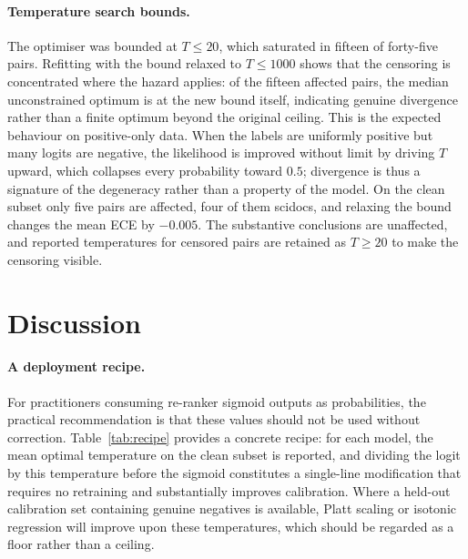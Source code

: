 \documentclass[sn-mathphys-num,pdflatex]{sn-jnl}
\begin{document}
\paragraph{Temperature search bounds.}
The optimiser was bounded at $T \leq 20$, which saturated in fifteen of forty-five
pairs. Refitting with the bound relaxed to $T \leq 1000$ shows that the censoring is
concentrated where the hazard applies: of the fifteen affected pairs, the median
unconstrained optimum is at the new bound itself, indicating genuine divergence
rather than a finite optimum beyond the original ceiling. This is the expected
behaviour on positive-only data. When the labels are uniformly positive but many
logits are negative, the likelihood is improved without limit by driving $T$ upward,
which collapses every probability toward $0.5$; divergence is thus a signature of
the degeneracy rather than a property of the model. On the clean subset only five
pairs are affected, four of them scidocs, and relaxing the bound changes the mean
ECE by $-0.005$. The substantive conclusions are unaffected, and reported
temperatures for censored pairs are retained as $T \geq 20$ to make the censoring
visible.

\section{Discussion}\label{sec:discussion}

\paragraph{A deployment recipe.}
For practitioners consuming re-ranker sigmoid outputs as probabilities, the
practical recommendation is that these values should not be used without
correction. Table~\ref{tab:recipe} provides a concrete recipe: for each model, the
mean optimal temperature on the clean subset is reported, and dividing the logit by
this temperature before the sigmoid constitutes a single-line modification that
requires no retraining and substantially improves calibration. Where a held-out
calibration set containing genuine negatives is available, Platt scaling or
isotonic regression will improve upon these temperatures, which should be regarded
as a floor rather than a ceiling.
\end{document}
